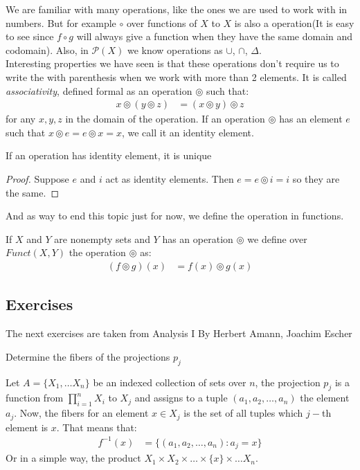 \documentclass{tufte-handout}
\begin{document}
We are familiar with many operations, like the ones we are used to work with in numbers. But for example $\circ$ over functions of $X$ to $X$ is also a operation(It is easy to see since $f \circ g$ will always give a function when they have the same domain and codomain). Also, in $\mathcal{P}(X)$ we know operations as $\cup$, $\cap$, $\Delta$. \\

Interesting properties we have seen is that these operations don't require us to write the with parenthesis when we work with more than 2 elements. It is called \textit{associativity}, defined formal as an operation $\circledcirc$ such that:
\begin{align*}
	x \circledcirc (y \circledcirc z) &= (x \circledcirc y) \circledcirc z
\end{align*}
for any $x, y, z$ in the domain of the operation. If an operation $\circledcirc$ has an element $e$ such that $x \circledcirc e = e \circledcirc x = x$, we call it an identity element. 

\begin{theorem}
	If an operation has identity element, it is unique
\end{theorem}
\begin{proof}
	Suppose $e$ and $i$ act as identity elements. Then $e = e \circledcirc i = i$ so they are the same.
\end{proof}

And as way to end this topic just for now, we define the operation in functions.
\begin{definition}
	If $X$ and $Y$ are nonempty sets and $Y$ has an operation $\circledcirc$ we define over $Funct(X, Y)$ the operation $\circledcirc$ as:
	\begin{align*}
		(f \circledcirc g)(x) &= f(x) \circledcirc g(x)
	\end{align*}
\end{definition}

\subsection{Exercises}
The next exercises are taken from Analysis I By Herbert Amann, Joachim Escher
\begin{problem}
	Determine the fibers of the projections $p_j$
\end{problem}
Let $A = \{X_1, \dots X_n\}$ be an indexed collection of sets over $n$, the projection $p_j$ is a function
from $\prod\limits_{i = 1}^n X_i$ to $X_j$ and assigns to a tuple $(a_1, a_2, \dots, a_n)$ the element $a_j$. Now, the fibers for an element $x \in X_j$ is the set of all tuples which $j-$th element is $x$. That means that:
\begin{align*}
	f^{-1}(x) &= \{(a_1, a_2, \dots, a_n): a_j = x\}
\end{align*}
Or in a simple way, the product $X_1 \times X_2 \times \dots \times\{x\} \times \dots X_n$. 
\end{document}
